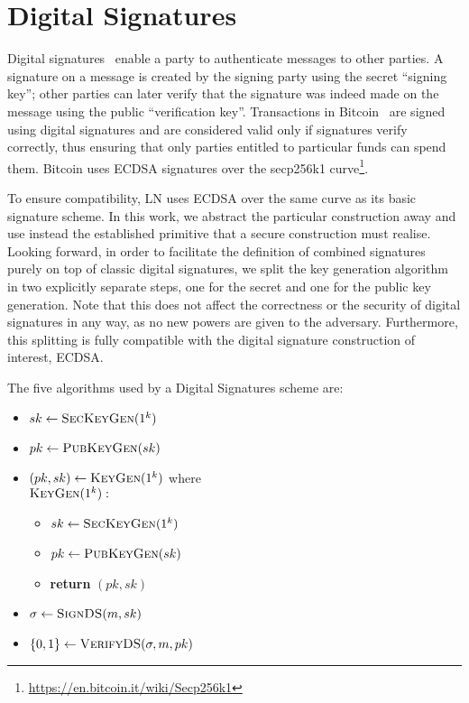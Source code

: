 \section{Digital Signatures}
\label{sec:ds}
  Digital signatures~\cite{katzlindell} enable a party to authenticate messages
  to other parties. A signature on a message is created by the signing party
  using the secret ``signing key''; other parties can later verify that the
  signature was indeed made on the message using the public ``verification
  key''. Transactions in Bitcoin~\cite{bitcoin} are signed using digital
  signatures and are considered valid only if signatures verify correctly, thus
  ensuring that only parties entitled to particular funds can spend them.
  Bitcoin uses ECDSA signatures over the secp256k1
  curve\footnote{\url{https://en.bitcoin.it/wiki/Secp256k1}}.

  To ensure compatibility, LN uses ECDSA over the same curve as its basic
  signature scheme. In this work, we abstract the particular construction away
  and use instead the established primitive that a secure construction must
  realise. Looking forward, in order to facilitate the definition of combined
  signatures purely on top of classic digital signatures, we split the key
  generation algorithm in two explicitly separate steps, one for the secret and
  one for the public key generation. Note that this does not affect the
  correctness or the security of digital signatures in any way, as no new powers
  are given to the adversary. Furthermore, this splitting is fully compatible
  with the digital signature construction of interest, ECDSA.

  The five algorithms used by a Digital Signatures scheme are:
  \begin{itemize}
    \item $sk \gets \textsc{SecKeyGen}(1^k)$
    \item $pk \gets \textsc{PubKeyGen}(sk)$
    \item $(pk, sk) \gets \textsc{KeyGen}(1^k)$ where \\
    $\textsc{KeyGen}(1^k):$
    \begin{itemize}[label={}]
      \item $sk \gets \textsc{SecKeyGen}(1^k)$
      \item $pk \gets \textsc{PubKeyGen}(sk)$
      \item \textbf{return} $(pk, sk)$
    \end{itemize}
    \item $\sigma \gets \textsc{SignDS}(m, sk)$
    \item $\{0, 1\} \gets \textsc{VerifyDS}(\sigma, m, pk)$
  \end{itemize}

